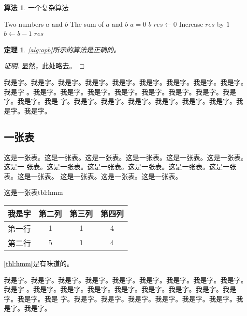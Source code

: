 \documentclass[supercite]{HustGraduPaper}
\newcommand{\ralg}[1]{\autoref{alg:#1}}
\newcommand{\rtbl}[1]{\autoref{tbl:#1}}
\newtheorem{thm}{定理}[section]
\theoremstyle{definition}
\newtheorem{alg}{算法}[section]
\begin{document}
\begin{shaded*}\begin{alg}{一个复杂算法}
  \label{alg:apb}
  \begin{algorithmic}
    \Input Two numbers $a$ and $b$
    \Output The sum of $a$ and $b$
      \If $a = 0$
        \State \Return $b$
      \EndIf
      \State $res \gets 0$
        \State Increase $res$ by $1$
        \State $b \gets b - 1$
      \EndWhile
      \State \Return $res$
    \EndProcedure
  \end{algorithmic}
\end{alg}\end{shaded*}

\begin{thm} \label{thm:gsb-apprx}
  \ralg{apb}所示的算法是正确的。
\end{thm}
\begin{proof}[证明]
  显然，此处略去。
\end{proof}

我是字。我是字。我是字。我是字。我是字。我是字。我是字。我是字。我是字。我是字
。我是字。我是字。我是字。我是字。我是字。我是字。我是字。我是字。我是字。我是
字。我是字。我是字。我是字。我是字。我是字。我是字。我是字。我是字。

\subsection{一张表}

这是一张表。这是一张表。这是一张表。这是一张表。这是一张表。这是一张表。这是一
张表。这是一张表。这是一张表。这是一张表。这是一张表。这是一张表。这是一张表。
这是一张表。这是一张表。这是一张表。

\begin{generaltab}{这是一张表}{tbl:hmm}
  \begin{tabular}{c|ccc}
    \toprule
    我是字 & 第二列 & 第三列 & 第四列 \\
    \midrule
    第一行 & $1$ & $1$ & $4$ \\
    第二行 & $5$ & $1$ & $4$ \\
    \bottomrule
  \end{tabular}
\end{generaltab}

\rtbl{hmm}是有味道的。

我是字。我是字。我是字。我是字。我是字。我是字。我是字。我是字。我是字。我是字
。我是字。我是字。我是字。我是字。我是字。我是字。我是字。我是字。我是字。我是
字。我是字。我是字。我是字。我是字。我是字。我是字。我是字。我是字。
\end{document}
